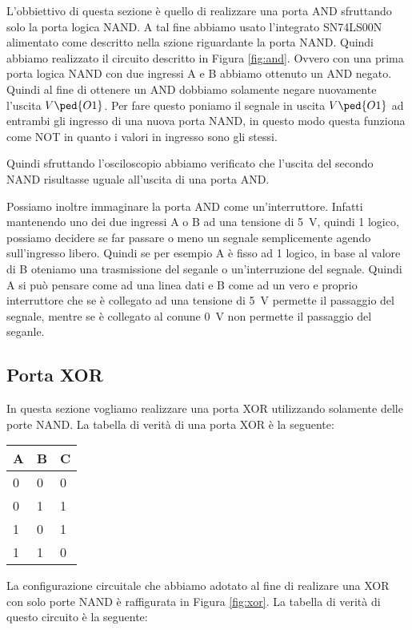 L'obbiettivo di questa sezione è quello di realizzare una porta AND sfruttando solo la porta logica NAND. A tal fine abbiamo usato l'integrato SN74LS00N alimentato come descritto nella szione riguardante la porta NAND.
Quindi abbiamo realizzato il circuito descritto in Figura \ref{fig:and}. Ovvero con una prima porta logica NAND con due ingressi A e B abbiamo ottenuto un AND negato. Quindi al fine di ottenere un AND dobbiamo solamente negare nuovamente l'uscita $V\ped{O1}$. Per fare questo poniamo il segnale in uscita $V\ped{O1}$ ad entrambi gli ingresso di una nuova porta NAND, in questo modo questa funziona come NOT in quanto i valori in ingresso sono gli stessi.

Quindi sfruttando l'osciloscopio abbiamo verificato che l'uscita del secondo NAND risultasse uguale all'uscita di una porta AND.

Possiamo inoltre immaginare la porta AND come un'interruttore. Infatti mantenendo uno dei due ingressi A o B ad una tensione di \SI{+5}{\volt}, quindi 1 logico, possiamo decidere se far passare o meno un segnale semplicemente agendo sull'ingresso libero.
Quindi se per esempio A è fisso ad 1 logico, in base al valore di B oteniamo una trasmissione del seganle o un'interruzione del segnale. Quindi A si può pensare come ad una linea dati e B come ad un vero e proprio interruttore che se è collegato ad una tensione di \SI{+5}{\volt} permette il passaggio del segnale, mentre se è collegato al conune \SI{0}{\volt} non permette il passaggio del seganle.

\subsection*{Porta XOR}

In questa sezione vogliamo realizzare una porta XOR utilizzando solamente delle porte NAND. La tabella di verità di una porta XOR è la seguente:

\begin{center}
	\begin{tabular}{lll}
	\toprule
		A & B & C \\
	\midrule
		0 & 0 & 0 \\
		0 & 1 & 1 \\
		1 & 0 & 1 \\
		1 & 1 & 0 \\
	\bottomrule
	\end{tabular}
\end{center}

La configurazione circuitale che abbiamo adotato al fine di realizare una XOR con solo porte NAND è raffigurata in Figura \ref{fig:xor}. La tabella di verità di questo circuito è la seguente:

